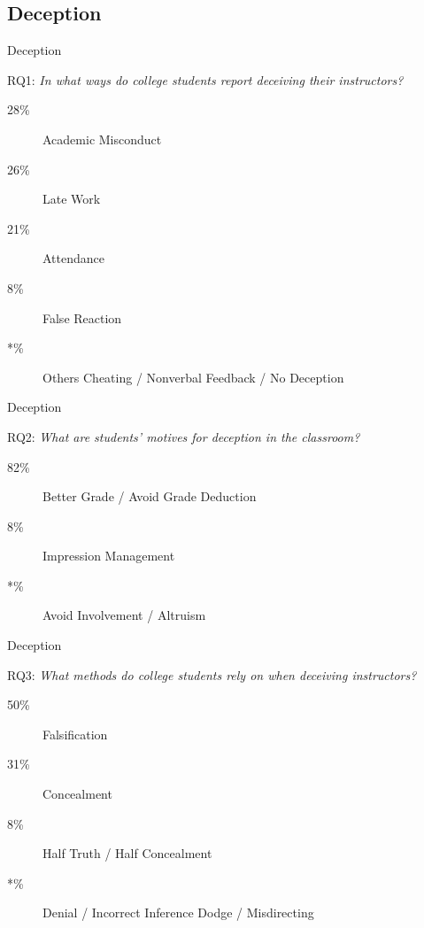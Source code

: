 	\subsection{Deception}

		\begin{frame}{Deception}
				
			RQ1: \emph{In what ways do college students report deceiving their instructors?}

			\begin{description}
				\item[28\%]
					Academic Misconduct
				\item[26\%]
					Late Work
				\item[21\%] 
					Attendance
				\item[8\%]
					False Reaction
				\item[*\%]
					Others Cheating / Nonverbal Feedback / No Deception
			\end{description}

		\end{frame}

		\begin{frame}{Deception}
				
			RQ2: \emph{What are students’ motives for deception in the classroom?}

			\begin{description}
				\item[82\%]
					Better Grade / Avoid Grade Deduction
				\item[8\%]
					Impression Management
				\item[*\%] 
					Avoid Involvement / Altruism
			\end{description}

		\end{frame}

		\begin{frame}{Deception}
				
			RQ3: \emph{What methods do college students rely on when deceiving instructors?}

			\begin{description}
				\item[50\%]
					Falsification
				\item[31\%]
					Concealment
				\item[8\%] 
					Half Truth / Half Concealment
				\item[*\%]
					Denial / Incorrect Inference Dodge / Misdirecting
			\end{description}

		\end{frame}

